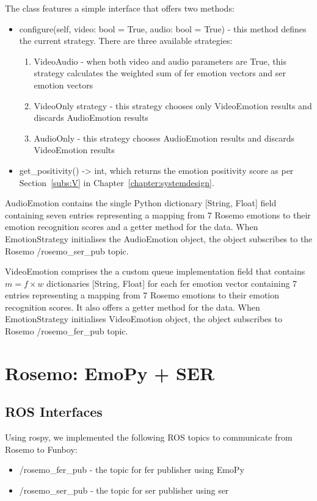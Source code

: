 The class features a simple interface that offers two methods:
\begin{itemize}
    \item configure(self, video: bool = True, audio: bool = True) - this method defines the current strategy. There are three available strategies:
    \begin{enumerate}
        \item VideoAudio - when both video and audio parameters are True, this strategy calculates the weighted sum of \acrshort{fer} emotion vectors and \acrshort{ser} emotion vectors
        \item VideoOnly strategy - this strategy chooses only VideoEmotion results and discards AudioEmotion results
        \item AudioOnly - this strategy chooses AudioEmotion results and discards VideoEmotion results
    \end{enumerate}
    \item get\_positivity() -> int, which returns the emotion positivity score as per Section~\ref{subs:V} in Chapter~\ref{chapter:systemdesign}.
\end{itemize}{}

AudioEmotion contains the single Python dictionary [String, Float] field containing seven entries representing a mapping from 7 Rosemo emotions to their emotion recognition scores and a getter method for the data. When EmotionStrategy initialises the AudioEmotion object, the object subscribes to the Rosemo /rosemo\_ser\_pub topic.

VideoEmotion comprises the a custom queue implementation field that contains \( m = f \times w\) dictionaries [String, Float] for each \acrshort{fer} emotion vector containing 7 entries representing a mapping from 7 Rosemo emotions to their emotion recognition scores. It also offers a getter method for the data. When EmotionStrategy initialises VideoEmotion object, the object subscribes to Rosemo /rosemo\_fer\_pub topic.

\section{Rosemo: EmoPy + SER}

\subsection{ROS Interfaces}

Using rospy, we implemented the following ROS topics to communicate from Rosemo to Funboy:
\begin{itemize}
    \item /rosemo\_fer\_pub - the topic for \acrlong{fer} publisher using EmoPy
    \item /rosemo\_ser\_pub - the topic for \acrlong{ser} publisher using \acrshort{ser}
\end{itemize}

